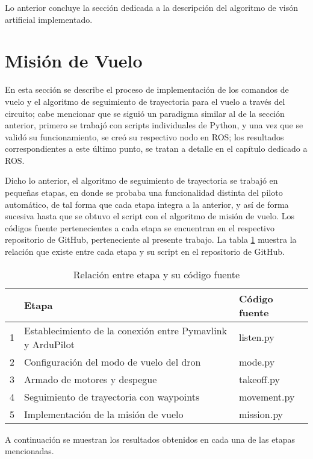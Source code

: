 Lo anterior concluye la sección dedicada a la descripción del algoritmo de visón artificial implementado.

\section{Misión de Vuelo}
En esta sección se describe el proceso de implementación de los comandos de vuelo y el algoritmo de seguimiento de trayectoria para el vuelo a través del circuito; cabe mencionar que se siguió un paradigma similar al de la sección anterior, primero se trabajó con scripts individuales de Python, y una vez que se validó su funcionamiento, se creó su respectivo nodo en ROS; los resultados correspondientes a este último punto, se tratan a detalle en el capítulo dedicado a ROS.

Dicho lo anterior, el algoritmo de seguimiento de trayectoria se trabajó en pequeñas etapas, en donde se probaba una funcionalidad distinta del piloto automático, de tal forma que cada etapa integra a la anterior, y así de forma sucesiva hasta que se obtuvo el script con el algoritmo de misión de vuelo. Los códigos fuente pertenecientes a cada etapa se encuentran en el respectivo repositorio de GitHub, perteneciente al presente trabajo. La tabla \ref{tab:pymavlink} muestra la relación que existe entre cada etapa y su script en el repositorio de GitHub.

\begin{table}[ht]
    \centering
    \begin{tabular}{lll}
        \hline
          & Etapa & Código fuente\\
        \hline
        1 & Establecimiento de la conexión entre Pymavlink y ArduPilot & listen.py\\
        2 & Configuración del modo de vuelo del dron & mode.py\\
        3 & Armado de motores y despegue & takeoff.py\\
        4 & Seguimiento de trayectoria con waypoints & movement.py\\
        5 & Implementación de la misión de vuelo & mission.py\\
        \hline
    \end{tabular}
    \caption{Relación entre etapa y su código fuente}
    \label{tab:pymavlink}
\end{table}

A continuación se muestran los resultados obtenidos en cada una de las etapas mencionadas. 

